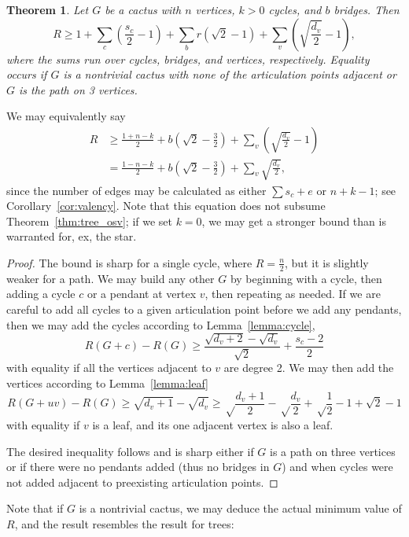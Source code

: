 \documentclass{amsart}
\newtheorem{thm}{Theorem}[section]%
\theoremstyle{definition}
\begin{document}
\begin{thm}\label{thm:cactus_osv}
Let $G$ be a cactus with $n$ vertices, $k>0$ cycles, and $b$ bridges. Then
\[R \geq 1+ \sum_{c} \left(\frac{s_c}{2} - 1\right) + \sum_br \left(\sqrt 2 - 1\right) + \sum_{v} \left(\sqrt{\frac{d_v}{2}}-1\right),\]
where the sums run over cycles, bridges, and vertices, respectively. Equality occurs if $G$ is a nontrivial cactus with none of the articulation points adjacent or $G$ is the path on 3 vertices.
\end{thm}

We may equivalently say
\[\begin{split}
R &\geq \frac{1+n-k}{2} + b\left(\sqrt 2 - \frac{3}{2}\right) + \sum_{v} \left(\sqrt{\frac{d_v}{2}}-1\right) \\
&=  \frac{1-n-k }{2} + b\left(\sqrt 2 - \frac{3}{2}\right) + \sum_{v} \sqrt{\frac{d_v}{2}},
\end{split}\]
since the number of edges may be calculated as either $\sum s_c + e$ or $n+k-1$; see Corollary~\ref{cor:valency}. Note that this equation does not subsume Theorem~\ref{thm:tree_osv}; if we set $k=0$, we may get a stronger bound than is warranted for, ex, the star.

\begin{proof}
The bound is sharp for a single cycle, where $R=\frac{n}{2}$, but it is slightly weaker for a path. We may build any other $G$ by beginning with a cycle, then adding a cycle $c$ or a pendant at vertex $v$, then repeating as needed. If we are careful to add all cycles to a given articulation point before we add any pendants, then we may add the cycles according to Lemma~\ref{lemma:cycle},
\[R(G + c) - R(G) \geq \frac{\sqrt{d_v+2}-\sqrt{d_v}}{\sqrt 2} + \frac{s_c-2}{2}\]
with equality if all the vertices adjacent to $v$ are degree 2. We may then add the vertices according to Lemma~\ref{lemma:leaf}
\[R(G + uv) - R(G) \geq \sqrt{d_v+1}-\sqrt{d_v} \geq \sqrt\frac{d_v+1}{2}-\sqrt\frac{d_v}{2}+ \sqrt\frac{1}{2} - 1 + \sqrt 2 - 1\]
with equality if $v$ is a leaf, and its one adjacent vertex is also a leaf. 

The desired inequality follows and is sharp either if $G$ is a path on three vertices or if there were no pendants added (thus no bridges in $G$) and when cycles were not added adjacent to preexisting articulation points.
\end{proof}

Note that if $G$ is a nontrivial cactus, we may deduce the actual minimum value of $R$, and the result resembles the result for trees:
\end{document}
